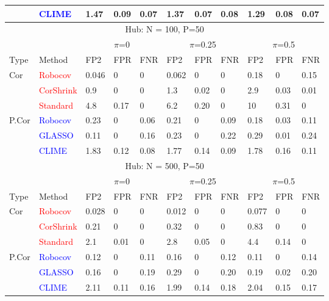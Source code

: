 \begin{longtable}[c]{|p{1cm}|p{1.5cm}|p{1cm}|p{1.0cm}|p{1.0cm}|p{1.0cm}|p{1.0cm}|p{1.0cm}|p{1.0cm}|p{1.0cm}|p{1.0cm}|}
& \textcolor{blue}{CLIME} & 1.47 & 0.09 & 0.07 & 1.37 & 0.07 & 0.08 & 1.29 & 0.08 & 0.07 \\ \hline 
\multicolumn{11}{|c|}{Hub: N = 100, P=50} \\ \hline
& & \multicolumn{3}{c|}{$\pi$=0} & \multicolumn{3}{c|}{$\pi$=0.25} & \multicolumn{3}{c|}{$\pi$=0.5} \\ \hline
Type & Method & FP2 & FPR & FNR &  FP2 & FPR & FNR & FP2 & FPR & FNR \\ \hline
\multirow{ 3}{*}{Cor} & \textcolor{red}{Robocov} & 0.046 &   0 &   0 & 0.062 &   0 &   0 & 0.18 &   0 & 0.15\\
& \textcolor{red}{CorShrink} & 0.9 &   0 &   0 & 1.3 & 0.02 &   0 & 2.9 & 0.03 & 0.01 \\
& \textcolor{red}{Standard} & 4.8 & 0.17 &   0 & 6.2 & 0.20 &  0 &  10 & 0.31 &  0 \\ \hline 
\multirow{ 3}{*}{P.Cor} & \textcolor{blue}{Robocov} & 0.23 & 0 & 0.06 & 0.21 & 0 & 0.09 & 0.18 & 0.03 & 0.11 \\
& \textcolor{blue}{GLASSO} & 0.11 & 0 & 0.16 & 0.23 & 0 & 0.22 & 0.29 & 0.01 & 0.24 \\
& \textcolor{blue}{CLIME}  & 1.83 & 0.12 & 0.08 & 1.77 & 0.14 & 0.09  & 1.78 & 0.16 & 0.11 \\ \hline 
\multicolumn{11}{|c|}{Hub: N = 500, P=50} \\ \hline
& & \multicolumn{3}{c|}{$\pi$=0} & \multicolumn{3}{c|}{$\pi$=0.25} & \multicolumn{3}{c|}{$\pi$=0.5} \\ \hline
Type & Method & FP2 & FPR & FNR &  FP2 & FPR & FNR & FP2 & FPR & FNR \\ \hline
\multirow{ 3}{*}{Cor} & \textcolor{red}{Robocov}  & 0.028 &   0 &   0 & 0.012 &   0 &   0 & 0.077 &   0 &   0  \\
& \textcolor{red}{CorShrink} & 0.21 &   0 &   0 & 0.32 &   0 &   0 & 0.83 &   0 &   0\\
& \textcolor{red}{Standard} & 2.1 & 0.01 &   0 & 2.8 & 0.05 &   0 & 4.4 & 0.14 &   0 \\ \hline 
\multirow{ 3}{*}{P.Cor} & \textcolor{blue}{Robocov} & 0.12 & 0 & 0.11 & 0.16 & 0 & 0.12 & 0.11 & 0 & 0.14 \\
& \textcolor{blue}{GLASSO} & 0.16 & 0 & 0.19 & 0.29 & 0 & 0.20 & 0.19 & 0.02 & 0.20 \\
& \textcolor{blue}{CLIME} & 2.11 & 0.11 & 0.16 & 1.99 & 0.14 & 0.18 & 2.04 & 0.15 & 0.17 \\ \hline 
\end{longtable}